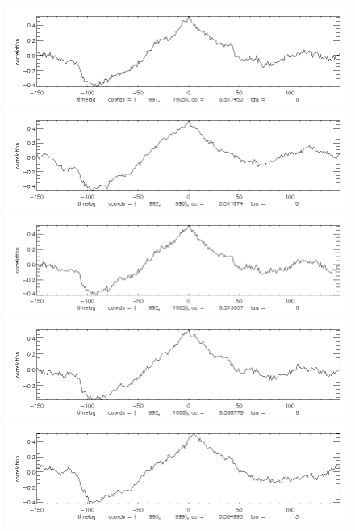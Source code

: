 \documentclass[12pt]{article}
\begin{document}
\begin{figure}[here] 
\centering
\includegraphics[width=7in]{cc01.png}
\includegraphics[width=7in]{cc02.png}
\includegraphics[width=7in]{cc03.png}
\includegraphics[width=7in]{cc04.png}
\includegraphics[width=7in]{cc05.png}
\end{figure}
\newpage
\end{document}
